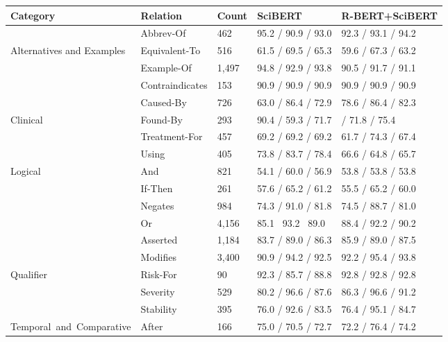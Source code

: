 \def\arraystretch{1.4}
\begin{tabular}{m{4.5cm} m{2.5cm} m{2cm} m{2.8cm} m{3cm}}
\toprule
    \textbf{Category} & \textbf{Relation} & \textbf{Count} & \textbf{SciBERT} & \textbf{R-BERT+SciBERT} \\ \midrule
     & Abbrev-Of &           462 & 95.2 / 90.9 / 93.0 & 92.3 / 93.1 / 94.2 \\
    Alternatives and Examples & Equivalent-To & 516 & 61.5 / 69.5 / 65.3 & 59.6 / 67.3 / 63.2 \\
     &                       Example-Of & 1,497 & 94.8 / 92.9 / 93.8 & 90.5 / 91.7 / 91.1 \\
    \hline
     &                       Contraindicates & 153 & 90.9 / 90.9 / 90.9 & 90.9 / 90.9 / 90.9 \\
     &                       Caused-By & 726 & 63.0 / 86.4 / 72.9 & 78.6 / 86.4 / 82.3 \\
     Clinical &              Found-By & 293 & 90.4 / 59.3 / 71.7 & \79.3 / 71.8 / 75.4 \\
     &                       Treatment-For & 457 & 69.2 / 69.2 / 69.2 & 61.7 / 74.3 / 67.4 \\
     &                       Using & 405 & 73.8 / 83.7 / 78.4 & 66.6 / 64.8 / 65.7 \\
    \hline
    \multirow{4}{}[0pt]{\mbox{Logical}} & And & 821 & 54.1 / 60.0 / 56.9 & 53.8 / 53.8 / 53.8 \\
     &                       If-Then & 261 & 57.6 / 65.2 / 61.2 & 55.5 / 65.2 / 60.0 \\
     &                       Negates & 984 & 74.3 / 91.0 / 81.8 & 74.5 / 88.7 / 81.0 \\
     &                       Or & 4,156 & 85.1 \ 93.2 \ 89.0 & 88.4 / 92.2 / 90.2 \\
    \hline
     &               Asserted & 1,184 & 83.7 / 89.0 / 86.3 & 85.9 / 89.0 / 87.5 \\
     &                       Modifies & 3,400 & 90.9 / 94.2 / 92.5 & 92.2 / 95.4 / 93.8 \\
    Qualifier &               Risk-For & 90 & 92.3 / 85.7 / 88.8 & 92.8 / 92.8 / 92.8 \\
     &                       Severity & 529 & 80.2 / 96.6 / 87.6 & 86.3 / 96.6 / 91.2 \\
     &                       Stability & 395 & 76.0 / 92.6 / 83.5 & 76.4 / 95.1 / 84.7 \\
    \hline
    \multirow{6}{}[-5pt]{\mbox{Temporal and Comparative}} & After & 166 & 75.0 / 70.5 / 72.7 & 72.2 / 76.4 / 74.2 \\

\end{tabular}
